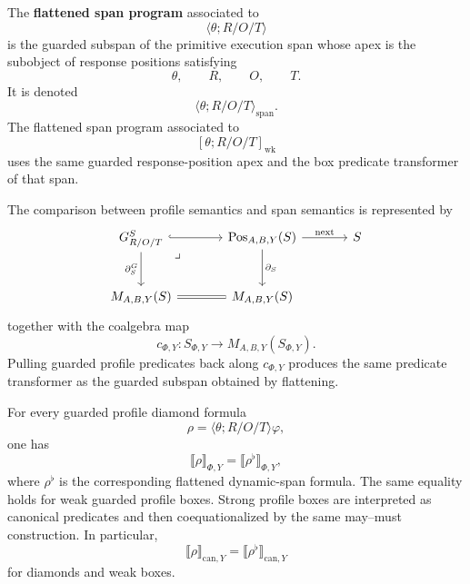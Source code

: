 \begin{definition}
\label{def:flattening-guarded-profile}
The \textbf{flattened span program} associated to
\[
  \langle\theta;R/O/T\rangle
\]
is the guarded subspan of the primitive execution span whose apex is the
subobject of response positions satisfying
\[
  \theta,
  \qquad
  R,
  \qquad
  O,
  \qquad
  T.
\]
It is denoted
\[
  \langle\theta;R/O/T\rangle_{\mathrm{span}}.
\]
The flattened span program associated to
\[
  [\theta;R/O/T]_{\mathrm{wk}}
\]
uses the same guarded response-position apex and the box predicate
transformer of that span.
\end{definition}

The comparison between profile semantics and span semantics is represented
by
\[
\begin{tikzcd}[column sep=large,row sep=large]
G^S_{R/O/T}
  \arrow[r, hook]
  \arrow[d, "\partial^G_S"']
  \arrow[dr, phantom, very near start, "\lrcorner"]
&
\operatorname{Pos}_{A,B,Y}(S)
  \arrow[d, "\partial_S"]
  \arrow[r, "\mathrm{next}"]
&
S
\\
M_{A,B,Y}(S)
  &
M_{A,B,Y}(S)
  \arrow[l, equal]
&
\end{tikzcd}
\]
together with the coalgebra map
\[
  c_{\Phi,Y}:S_{\Phi,Y}\to M_{A,B,Y}(S_{\Phi,Y}).
\]
Pulling guarded profile predicates back along \(c_{\Phi,Y}\) produces the
same predicate transformer as the guarded subspan obtained by flattening.

\begin{theorem}
\label{thm:profile-flattening}
For every guarded profile diamond formula
\[
  \rho=\langle\theta;R/O/T\rangle\varphi,
\]
one has
\[
  \llbracket \rho\rrbracket_{\Phi,Y}
  =
  \llbracket \rho^\flat\rrbracket_{\Phi,Y},
\]
where \(\rho^\flat\) is the corresponding flattened dynamic-span formula.
The same equality holds for weak guarded profile boxes.  Strong profile boxes
are interpreted as canonical predicates and then coequationalized by the same
may--must construction.  In particular,
\[
  \llbracket \rho\rrbracket_{\mathrm{can},Y}
  =
  \llbracket \rho^\flat\rrbracket_{\mathrm{can},Y}
\]
for diamonds and weak boxes.
\end{theorem}

